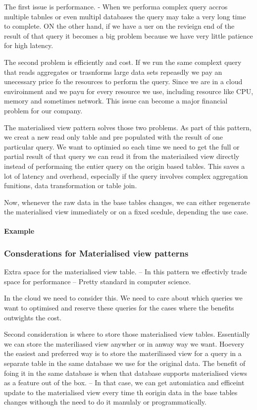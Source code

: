 \documentclass[a4paper, 11pt]{book}
\begin{document}
    The first issue is performance.
    - When we performa complex query accros multiple tabnles or even multipl databases the query may take a very long time to complete.
    ON the other hand, if we have a uer on the revieign end of the result of that query it becomes a big problem because we have very little patience for high latency.

    The second problem is efficiently and cost.
    If we run the same complext query that reads aggregates or trasnforms large data sets repeasdly we pay an unecessary price fo the resources to perform the query.
    Since we are in a cloud enviroinment and we payu for every resource we use, including resource like CPU, memory and sometimes network. This issue can become a major financial problem for our company.

    The materialised view pattern solves those two problems.
    As part of this pattern, we creat a new read only table and pre populated with the result of one particular query.
    We want to optimied so each time we need to get the full or partial result of that query we can read it from the materiailsed view directly instead of performaing the entier query on the origin based tables.
    This saves a lot of latency and overhead, especially if the query involves complex aggregation funitions, data transformation or table join.

    Now, whenever the raw data in the base tables changes, we can either regenerate the materialised view immediately or on a fixed scedule, depending the use case.

    \paragraph{Example}

    \subsubsection{Consderations for Materialised view patterns}
    Extra space for the materialised view table.
    -- In this pattern we effectivly trade space for performance
    -- Pretty standard in computer science.

    In the cloud we need to consider this.
    We need to care about which queries we want to optimised and reserve these queries for the cases where the benefits outwights the cost.

    Second consideration is where to store those materialised view tables.
    Essentially we can store the materiliased view anywher or in anway way we want.
    Hoevery the easiest and preferred way is to store the materiliased view for a query in a separate table in the same database we use for the original data.
    The benefit of foing it in the same database is when that database supports materialised views as a feature out of the box.
    -- In that case, we can get automiatica and efficeint update to the materialised view every time th eorigin data in the base tables changes withough the need to do it manulaly or programmatically.
\end{document}
